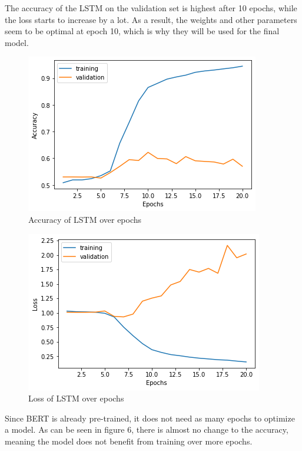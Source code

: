 \documentclass[11pt, a4paper]{article}
\begin{document}
The accuracy of the LSTM on the validation set is highest after 10 epochs, while the loss starts to increase by a lot. As a result, the weights and other parameters
seem to be optimal at epoch 10, which is why they will be used for the final model.
\begin{figure}
    \centering
    \includegraphics[scale=0.5]{LSTM_acc.png}
    \caption{Accuracy of LSTM over epochs}
    \label{fig:LSTM_acc}
\end{figure}
\begin{figure}
    \centering
    \includegraphics[scale=0.5]{LSTM_Loss.png}
    \caption{Loss of LSTM over epochs}
    \label{fig:LSTM_Loss}
\end{figure}

Since BERT is already pre-trained, it does not need as many epochs to optimize a model. As can be seen in figure 6, there is almost no change to the accuracy, meaning the model does not benefit from training over more epochs.
\end{document}
